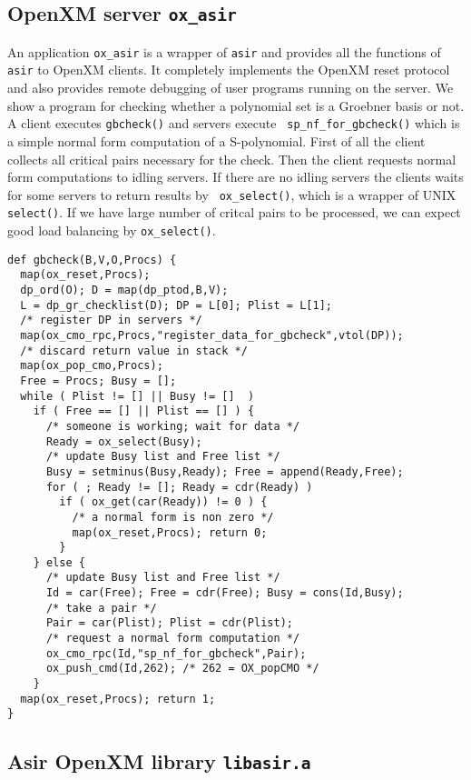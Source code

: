 \documentclass[runningheads]{cl2emult}
\begin{document}
\subsection{OpenXM server {\tt ox\_asir}}

An application {\tt ox\_asir} is a wrapper of {\tt asir} and provides
all the functions of {\tt asir} to OpenXM clients. It completely
implements the OpenXM reset protocol and also provides remote
debugging of user programs running on the server. We show a program
for checking whether a polynomial set is a Groebner basis or not. A
client executes {\tt gbcheck()} and servers execute {\tt
sp\_nf\_for\_gbcheck()} which is a simple normal form computation of a
S-polynomial. First of all the client collects all critical pairs
necessary for the check. Then the client requests normal form
computations to idling servers. If there are no idling servers the
clients waits for some servers to return results by {\tt
ox\_select()}, which is a wrapper of UNIX {\tt select()}. If we have
large number of critcal pairs to be processed, we can expect
good load balancing by {\tt ox\_select()}.

\begin{verbatim}
def gbcheck(B,V,O,Procs) {
  map(ox_reset,Procs);
  dp_ord(O); D = map(dp_ptod,B,V);  
  L = dp_gr_checklist(D); DP = L[0]; Plist = L[1];
  /* register DP in servers */
  map(ox_cmo_rpc,Procs,"register_data_for_gbcheck",vtol(DP));
  /* discard return value in stack */
  map(ox_pop_cmo,Procs);
  Free = Procs; Busy = [];
  while ( Plist != [] || Busy != []  )
    if ( Free == [] || Plist == [] ) {
      /* someone is working; wait for data */
      Ready = ox_select(Busy);
	  /* update Busy list and Free list */
      Busy = setminus(Busy,Ready); Free = append(Ready,Free);
      for ( ; Ready != []; Ready = cdr(Ready) )
        if ( ox_get(car(Ready)) != 0 ) {
		  /* a normal form is non zero */
          map(ox_reset,Procs); return 0;
        }
    } else {
	  /* update Busy list and Free list */
      Id = car(Free); Free = cdr(Free); Busy = cons(Id,Busy);
	  /* take a pair */
	  Pair = car(Plist); Plist = cdr(Plist);
	  /* request a normal form computation */
      ox_cmo_rpc(Id,"sp_nf_for_gbcheck",Pair);
      ox_push_cmd(Id,262); /* 262 = OX_popCMO */
    }
  map(ox_reset,Procs); return 1;
}
\end{verbatim}

\subsection{Asir OpenXM library {\tt libasir.a}}
\end{document}
